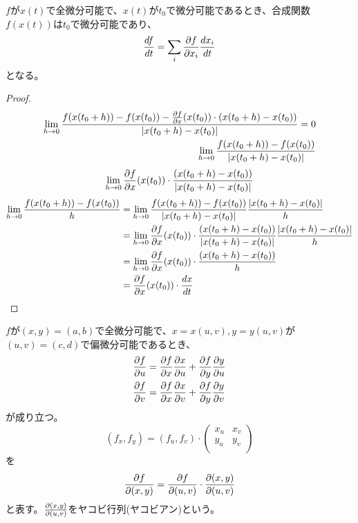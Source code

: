 \begin{prop}[合成関数の微分]
	$f$が$x(t)$で全微分可能で、$x(t)$が$t_0$で微分可能であるとき、合成関数$f(x(t))$は$t_0$で微分可能であり、
		\[\de[f]{t} = \sum_i \pd[f]{x_i}\de[x_i]{t}\]
	となる。
\end{prop}
\begin{proof}
	\begin{align*}
		\lim_{h \to 0} \frac{f(x(t_0 + h)) - f(x(t_0)) - \pd[f]{x}(x(t_0)) \cdot (x(t_0 + h) - x(t_0))}{|x(t_0 + h) - x(t_0)|} = 0\\
        \lim_{h \to 0} \frac{f(x(t_0 + h)) - f(x(t_0))}{|x(t_0 + h) - x(t_0)|}
    \end{align*}
        \[\lim_{h \to 0} \pd[f]{x}(x(t_0)) \cdot \frac{(x(t_0 + h) - x(t_0))}{|x(t_0 + h) - x(t_0)|}\]
    \begin{align*}
        \lim_{h \to 0} \frac{f(x(t_0 + h)) - f(x(t_0))}{h}
        &= \lim_{h \to 0} \frac{f(x(t_0 + h)) - f(x(t_0))}{|x(t_0 + h) - x(t_0)|}\frac{|x(t_0 + h) - x(t_0)|}{h}\\
		&= \lim_{h \to 0} \pd[f]{x}(x(t_0)) \cdot \frac{(x(t_0 + h) - x(t_0))}{|x(t_0 + h) - x(t_0)|}\frac{|x(t_0 + h) - x(t_0)|}{h}\\
		&= \lim_{h \to 0} \pd[f]{x}(x(t_0)) \cdot \frac{(x(t_0 + h) - x(t_0))}{h}\\
		&= \pd[f]{x}(x(t_0)) \cdot \de[x]{t}
	\end{align*}
\end{proof}

\begin{cor}
	$f$が$(x, y) = (a, b)$で全微分可能で、$x = x(u, v), y = y(u, v)$が$(u, v) = (c, d)$で偏微分可能であるとき、
	\begin{align*}
		\pd[f]{u} &= \pd[f]{x}\pd[x]{u} + \pd[f]{y}\pd[y]{u}\\
		\pd[f]{v} &= \pd[f]{x}\pd[x]{v} + \pd[f]{y}\pd[y]{v}\\
	\end{align*}
	が成り立つ。
		\[(f_x, f_y) = (f_u, f_v) \cdot \begin{pmatrix} x_u & x_v \\ y_u & y_v \\\end{pmatrix}\]
	を
		\[\pd[f]{(x, y)} = \pd[f]{(u, v)} \cdot \pd[(x, y)]{(u, v)}\]
	と表す。$\pd[(x, y)]{(u, v)}$をヤコビ行列(ヤコビアン)という。
\end{cor}